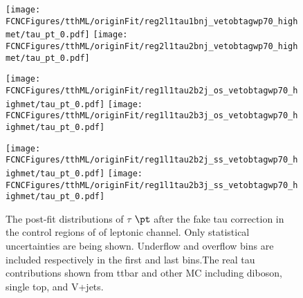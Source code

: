 \begin{figure}[H]
\centering
\texttt{[image: \\FCNCFigures/tthML/originFit/reg2l1tau1bnj\_vetobtagwp70\_highmet/tau\_pt\_0.pdf]}
\texttt{[image: \\FCNCFigures/tthML/originFit/reg2l1tau2bnj\_vetobtagwp70\_highmet/tau\_pt\_0.pdf]}

\texttt{[image: \\FCNCFigures/tthML/originFit/reg1l1tau2b2j\_os\_vetobtagwp70\_highmet/tau\_pt\_0.pdf]}
\texttt{[image: \\FCNCFigures/tthML/originFit/reg1l1tau2b3j\_os\_vetobtagwp70\_highmet/tau\_pt\_0.pdf]}

\texttt{[image: \\FCNCFigures/tthML/originFit/reg1l1tau2b2j\_ss\_vetobtagwp70\_highmet/tau\_pt\_0.pdf]}
\texttt{[image: \\FCNCFigures/tthML/originFit/reg1l1tau2b3j\_ss\_vetobtagwp70\_highmet/tau\_pt\_0.pdf]}
\caption{ The post-fit distributions of $\tau$ $\pt$  after the fake tau correction in the control regions of of leptonic channel. Only statistical uncertainties are being shown. Underflow and overflow bins are included respectively in the first and last bins.The real tau contributions shown from ttbar and other MC including diboson, single top, and V+jets.}

\label{fig:wjet_pt_postfit_CR}
\end{figure}
